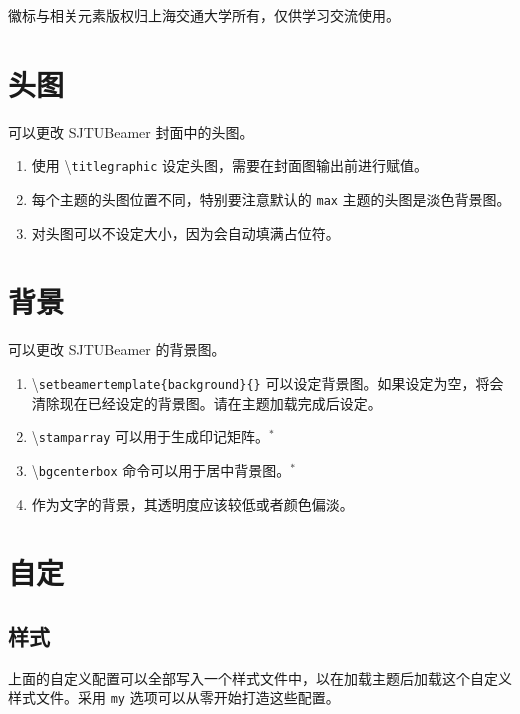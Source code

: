 \documentclass[
    UTF8,
    heading=true,
    12pt,
    a4paper
]{ctexrep}
\newenvironment{commentlist}
{\begin{enumerate}\small}
{\end{enumerate}}
\newcommand{\cmd}[1]{\textbackslash{}\texttt{#1}}
\newcommand{\opt}[1]{\texttt{#1}}
\def\themename{\textsf{SJTUBeamer}}
\begin{document}
\faInfoCircle{} 徽标与相关元素版权归上海交通大学所有，仅供学习交流使用。

\chapter{头图}

可以更改 \themename{} 封面中的头图。


\begin{commentlist}
  \item 使用 \cmd{titlegraphic} 设定头图，需要在封面图输出前进行赋值。
  \item 每个主题的头图位置不同，特别要注意默认的 \opt{max}
  主题的头图是淡色背景图。
  \item 对头图可以不设定大小，因为会自动填满占位符。
\end{commentlist}

\chapter{背景}

可以更改 \themename{} 的背景图。


\begin{commentlist}
  \item \cmd{setbeamertemplate\{background\}\{\}}
  可以设定背景图。如果设定为空，将会清除现在已经设定的背景图。请在主题加载完成后设定。
  \item \cmd{stamparray} 可以用于生成印记矩阵。$^*$
  \item \cmd{bgcenterbox} 命令可以用于居中背景图。$^*$
  \item 作为文字的背景，其透明度应该较低或者颜色偏淡。
\end{commentlist}

\chapter{自定}

\section{样式}

上面的自定义配置可以全部写入一个样式文件中，以在加载主题后加载这个自定义样式文件。采用
\texttt{my} 选项可以从零开始打造这些配置。

\end{document}
